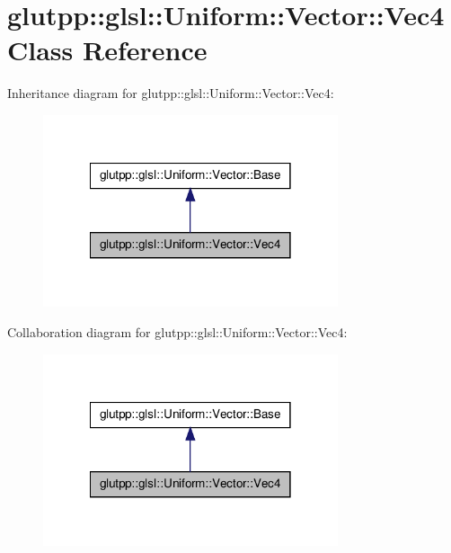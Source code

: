 \hypertarget{classglutpp_1_1glsl_1_1Uniform_1_1Vector_1_1Vec4}{\section{glutpp\-:\-:glsl\-:\-:\-Uniform\-:\-:\-Vector\-:\-:\-Vec4 \-Class \-Reference}
\label{classglutpp_1_1glsl_1_1Uniform_1_1Vector_1_1Vec4}
}


\-Inheritance diagram for glutpp\-:\-:glsl\-:\-:\-Uniform\-:\-:\-Vector\-:\-:\-Vec4\-:
\nopagebreak
\begin{figure}[H]
\begin{center}
\leavevmode
\includegraphics[width=246pt]{classglutpp_1_1glsl_1_1Uniform_1_1Vector_1_1Vec4__inherit__graph}
\end{center}
\end{figure}


\-Collaboration diagram for glutpp\-:\-:glsl\-:\-:\-Uniform\-:\-:\-Vector\-:\-:\-Vec4\-:
\nopagebreak
\begin{figure}[H]
\begin{center}
\leavevmode
\includegraphics[width=246pt]{classglutpp_1_1glsl_1_1Uniform_1_1Vector_1_1Vec4__coll__graph}
\end{center}
\end{figure}
